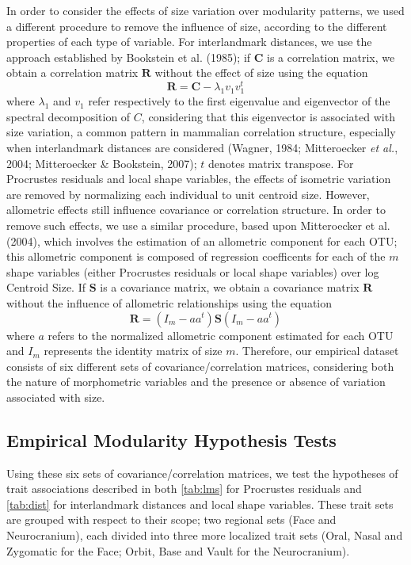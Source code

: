 \documentclass[12pt,]{article}
\begin{document}
In order to consider the effects of size variation over modularity
patterns, we used a different procedure to remove the influence of size,
according to the different properties of each type of variable. For
interlandmark distances, we use the approach established by Bookstein et
al. (1985); if $\mathbf{C}$ is a correlation matrix, we obtain a
correlation matrix $\mathbf{R}$ without the effect of size using the
equation \[
\mathbf{R} = \mathbf{C} - \lambda_1 v_1 v^{t}_1
\] where $\lambda_1$ and $v_1$ refer respectively to the first
eigenvalue and eigenvector of the spectral decomposition of $C$,
considering that this eigenvector is associated with size variation, a
common pattern in mammalian correlation structure, especially when
interlandmark distances are considered (Wagner, 1984; Mitteroecker
\emph{et al.}, 2004; Mitteroecker \& Bookstein, 2007); $t$ denotes
matrix transpose. For Procrustes residuals and local shape variables,
the effects of isometric variation are removed by normalizing each
individual to unit centroid size. However, allometric effects still
influence covariance or correlation structure. In order to remove such
effects, we use a similar procedure, based upon Mitteroecker et al.
(2004), which involves the estimation of an allometric component for
each OTU; this allometric component is composed of regression
coefficents for each of the $m$ shape variables (either Procrustes
residuals or local shape variables) over log Centroid Size. If
$\mathbf{S}$ is a covariance matrix, we obtain a covariance matrix
$\mathbf{R}$ without the influence of allometric relationships using the
equation \[
\mathbf{R} = (I_m - aa^t) \mathbf{S} (I_m - aa^t)
\] where $a$ refers to the normalized allometric component estimated for
each OTU and $I_m$ represents the identity matrix of size $m$.
Therefore, our empirical dataset consists of six different sets of
covariance/correlation matrices, considering both the nature of
morphometric variables and the presence or absence of variation
associated with size.

\subsection{Empirical Modularity Hypothesis
Tests}\label{empirical-modularity-hypothesis-tests}

Using these six sets of covariance/correlation matrices, we test the
hypotheses of trait associations described in both \autoref{tab:lms} for
Procrustes residuals and \autoref{tab:dist} for interlandmark distances
and local shape variables. These trait sets are grouped with respect to
their scope; two regional sets (Face and Neurocranium), each divided
into three more localized trait sets (Oral, Nasal and Zygomatic for the
Face; Orbit, Base and Vault for the Neurocranium).
\end{document}
